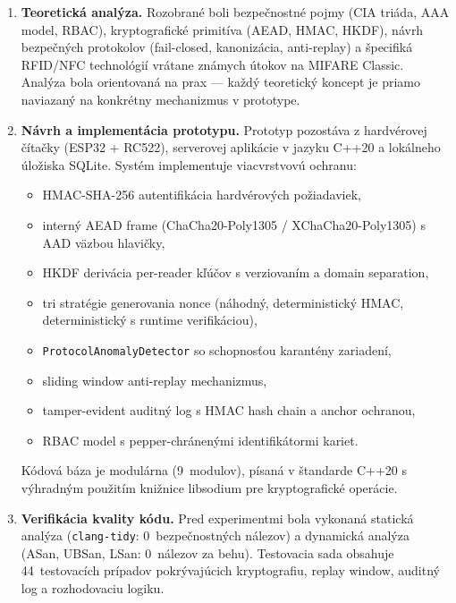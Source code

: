 \begin{enumerate}[leftmargin=*,itemsep=3pt]
  \item \textbf{Teoretická analýza.} Rozobrané boli bezpečnostné pojmy (CIA triáda, AAA model, RBAC), kryptografické primitíva (AEAD, HMAC, HKDF), návrh bezpečných protokolov (fail-closed, kanonizácia, anti-replay) a špecifiká RFID/NFC technológií vrátane známych útokov na MIFARE Classic\cite{GarciaMIFARE2008}. Analýza bola orientovaná na prax --- každý teoretický koncept je priamo naviazaný na konkrétny mechanizmus v prototype.

  \item \textbf{Návrh a implementácia prototypu.} Prototyp pozostáva z hardvérovej čítačky (ESP32 + RC522\cite{Espressif2024}), serverovej aplikácie v jazyku C++20 a lokálneho úložiska SQLite. Systém implementuje viacvrstvovú ochranu:
  \begin{itemize}[itemsep=1pt]
    \item HMAC-SHA-256 autentifikácia hardvérových požiadaviek,
    \item interný AEAD frame (ChaCha20-Poly1305\cite{RFC8439} / XChaCha20-Poly1305\cite{XChaChaDraft}) s AAD väzbou hlavičky,
    \item HKDF derivácia per-reader kľúčov\cite{RFC5869} s verziovaním a domain separation,
    \item tri stratégie generovania nonce (náhodný, deterministický HMAC, deterministický s runtime verifikáciou),
    \item \texttt{ProtocolAnomalyDetector} so schopnosťou karantény zariadení,
    \item sliding window anti-replay mechanizmus,
    \item tamper-evident auditný log s HMAC hash chain\cite{SchneierKelsey1999} a anchor ochranou,
    \item RBAC model s pepper-chránenými identifikátormi kariet.
  \end{itemize}
  Kódová báza je modulárna (9~modulov), písaná v štandarde C++20 s výhradným použitím knižnice libsodium pre kryptografické operácie\cite{LibsodiumXChaChaDoc}.

  \item \textbf{Verifikácia kvality kódu.} Pred experimentmi bola vykonaná statická analýza (\texttt{clang-tidy}\cite{ClangTidy}: 0~bezpečnostných nálezov) a dynamická analýza (ASan\cite{AddressSanitizer}, UBSan, LSan: 0~nálezov za behu). Testovacia sada\cite{GoogleTest} obsahuje 44~testovacích prípadov pokrývajúcich kryptografiu, replay window, auditný log a rozhodovaciu logiku.


\end{enumerate}
